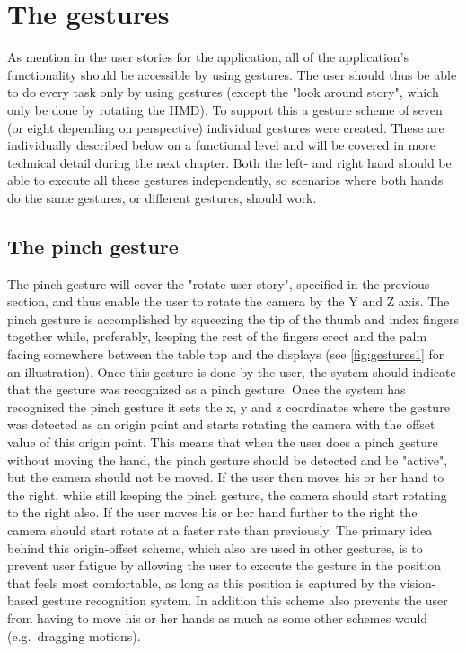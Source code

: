 \section{The gestures}
As mention in the user stories for the application, all of the application's functionality should be accessible by using gestures. The user should thus
be able to do every task only by using gestures (except the "look around story", which only be done by rotating the HMD). To support this a gesture scheme of seven (or eight depending
on perspective) individual gestures were created. 
These are individually described below on a functional level and will be covered in more technical detail during the next chapter. 
Both the left- and right hand should be able to execute all these gestures independently, so scenarios where both hands do the same gestures, or different gestures, should
work.
 
\subsection{The pinch gesture}
The pinch gesture will cover the "rotate user story", specified in the previous section, and thus enable the user to rotate the camera by the Y and Z axis. 
The pinch gesture is accomplished by squeezing the tip of the thumb and index fingers together while, preferably, keeping the rest of the fingers erect and the palm facing 
somewhere between the table top and the displays (see \ref{fig:gestures1} for an illustration). Once this gesture is done by the user, 
the system should indicate that the gesture was recognized as a pinch gesture.
Once the system has recognized the pinch gesture it sets the x, y and z coordinates where the gesture was detected as an origin point and starts rotating the 
camera with the offset value of this origin point. This means that when the user does a pinch gesture without moving the hand, the pinch gesture should be detected and be
"active", but the camera should not be moved. If the user then moves his or her hand to the right, while still keeping the pinch gesture, the camera should start rotating 
to the right also. If the user moves his or her hand further to the right the camera should start rotate at a faster rate than previously.  
The primary idea behind this origin-offset scheme, which also are used in other gestures, is to prevent user fatigue by allowing the user to execute
the gesture in the position that feels most comfortable, as long as this position is captured by the vision-based gesture recognition system. 
In addition this scheme also prevents the user from having to move his or her hands as much as some other schemes would (e.g.~dragging motions).  


